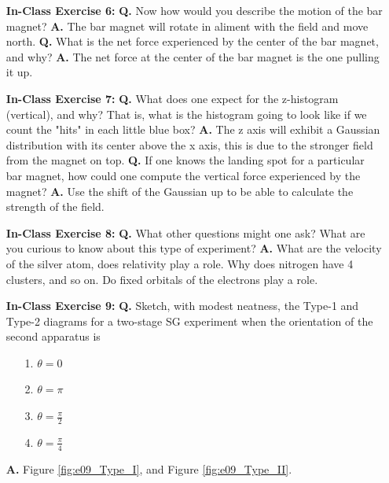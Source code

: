 \documentclass[main.tex]{subfiles}
\begin{document}
\begin{enumerate}
\item[] \textbf{In-Class Exercise 6:} \textbf{Q.} Now how would you describe the motion of the bar magnet? \textbf{A.} The bar magnet will rotate in aliment with the field and move north. \textbf{Q.} What is the net force experienced by the center of the bar magnet, and why? \textbf{A.} The net force at the center of the bar magnet is the one pulling it up.

\item[] \textbf{In-Class Exercise 7:} \textbf{Q.} What does one expect for the z-histogram (vertical), and why? That is, what is the histogram going to look like if we count the "hits" in each little blue box? \textbf{A.} The z axis will exhibit a Gaussian distribution with its center above the x axis, this is due to the stronger field from the magnet on top. \textbf{Q.} If one knows the landing spot for a particular bar magnet, how could one compute the vertical force experienced by the magnet? \textbf{A.} Use the shift of the Gaussian up to be able to calculate the strength of the field.

\item[] \textbf{In-Class Exercise 8:} \textbf{Q.} What other questions might one ask? What are you curious to know about this type of experiment? \textbf{A.} What are the velocity of the silver atom, does relativity play a role. Why does nitrogen have 4 clusters, and so on. Do fixed orbitals of the electrons play a role.

\item[] \textbf{In-Class Exercise 9:} \textbf{Q.} Sketch, with modest neatness, the Type-1 and Type-2 diagrams for a two-stage SG experiment when the orientation of the second apparatus is

    \begin{enumerate}
        \item[1.] $\theta=0$
        \item[2.] $\theta=\pi$
        \item[3.] $\theta=\frac{\pi}{2}$
        \item[4.] $\theta=\frac{\pi}{4}$
    \end{enumerate}
    
    \textbf{A.} Figure \ref{fig:e09_Type_I}, and Figure \ref{fig:e09_Type_II}. 
    

\end{enumerate}
\end{document}
